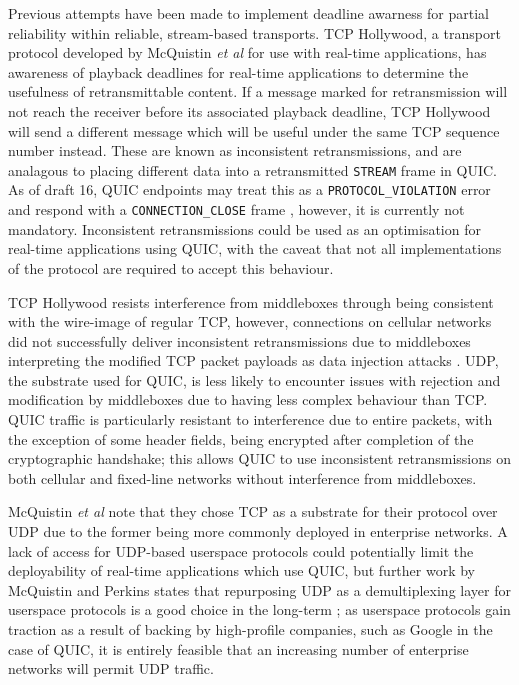\documentclass{mprop}
\begin{document}
Previous attempts have been made to implement deadline awarness for partial reliability within reliable, stream-based transports. TCP Hollywood, a transport protocol developed by McQuistin \textit{et al} \cite{McQuistin2016} for use with real-time applications, has awareness of playback deadlines for real-time applications to determine the usefulness of retransmittable content. If a message marked for retransmission will not reach the receiver before its associated playback deadline, TCP Hollywood will send a different message which will be useful under the same TCP sequence number instead. These are known as inconsistent retransmissions, and are analagous to placing different data into a retransmitted \texttt{STREAM} frame in QUIC. As of draft 16, QUIC endpoints may treat this as a \texttt{PROTOCOL\_VIOLATION} error and respond with a \texttt{CONNECTION\_CLOSE} frame \cite{quic-transport-16}, however, it is currently not mandatory. Inconsistent retransmissions could be used as an optimisation for real-time applications using QUIC, with the caveat that not all implementations of the protocol are required to accept this behaviour.

TCP Hollywood resists interference from middleboxes through being consistent with the wire-image of regular TCP, however, connections on cellular networks did not successfully deliver inconsistent retransmissions due to middleboxes interpreting the modified TCP packet payloads as data injection attacks \cite{McQuistin2016Ossification}. UDP, the substrate used for QUIC, is less likely to encounter issues with rejection and modification by middleboxes due to having less complex behaviour than TCP. QUIC traffic is particularly resistant to interference due to entire packets, with the exception of some header fields, being encrypted after completion of the cryptographic handshake; this allows QUIC to use inconsistent retransmissions on both cellular and fixed-line networks without interference from middleboxes.

McQuistin \textit{et al} note that they chose TCP as a substrate for their protocol over UDP due to the former being more commonly deployed in enterprise networks. A lack of access for UDP-based userspace protocols could potentially limit the deployability of real-time applications which use QUIC, but further work by McQuistin and Perkins states that repurposing UDP as a demultiplexing layer for userspace protocols is a good choice in the long-term \cite{McQuistin2016Ossification}; as userspace protocols gain traction as a result of backing by high-profile companies, such as Google in the case of QUIC, it is entirely feasible that an increasing number of enterprise networks will permit UDP traffic.
\end{document}
